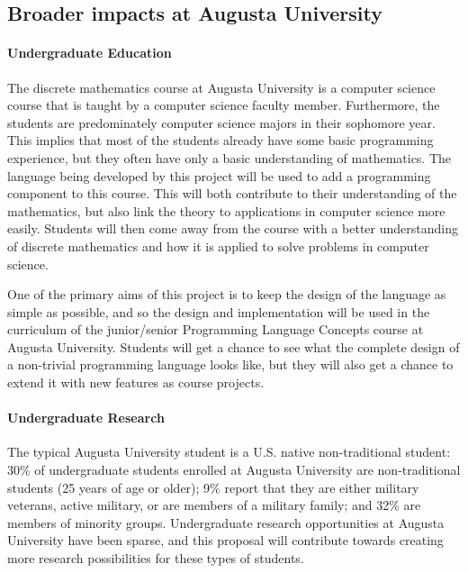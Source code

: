 \subsection{Broader impacts at Augusta University}
\label{subsec:broader_impacts_at_augusta_university}

\paragraph{Undergraduate Education}  The discrete mathematics course at Augusta
University is a computer science course that is taught by a computer
science faculty member.  Furthermore, the students are predominately
computer science majors in their sophomore year.  This implies that
most of the students already have some basic programming experience,
but they often have only a basic understanding of mathematics.  The
language being developed by this project will be used to add a
programming component to this course.  This will both contribute to
their understanding of the mathematics, but also link the theory to
applications in computer science more easily.  Students will then come
away from the course with a better understanding of discrete
mathematics and how it is applied to solve problems in computer
science.

One of the primary aims of this project is to keep the design of the
language as simple as possible, and so the design and implementation
will be used in the curriculum of the junior/senior Programming
Language Concepts course at Augusta University.  Students will get a
chance to see what the complete design of a non-trivial programming
language looks like, but they will also get a chance to extend it with
new features as course projects.

\paragraph{Undergraduate Research}  The typical Augusta University
student is a U.S. native non-traditional student: 30\% of
undergraduate students enrolled at Augusta University are
non-traditional students (25 years of age or older); 9\% report that
they are either military veterans, active military, or are members of
a military family; and 32\% are members of minority groups.
Undergraduate research opportunities at Augusta University have been
sparse, and this proposal will contribute towards creating more
research possibilities for these types of students.


